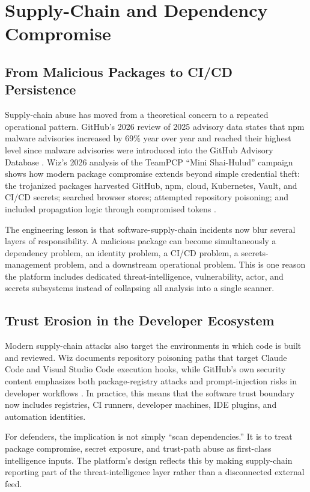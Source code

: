 \section{Supply-Chain and Dependency Compromise}
\subsection{From Malicious Packages to CI/CD Persistence}
Supply-chain abuse has moved from a theoretical concern to a repeated operational pattern. GitHub's 2026 review of 2025 advisory data states that npm malware advisories increased by 69\% year over year and reached their highest level since malware advisories were introduced into the GitHub Advisory Database \cite{github_oss_trends_2026}. Wiz's 2026 analysis of the TeamPCP ``Mini Shai-Hulud'' campaign shows how modern package compromise extends beyond simple credential theft: the trojanized packages harvested GitHub, npm, cloud, Kubernetes, Vault, and CI/CD secrets; searched browser stores; attempted repository poisoning; and included propagation logic through compromised tokens \cite{wiz_supply_chain_2026}.

The engineering lesson is that software-supply-chain incidents now blur several layers of responsibility. A malicious package can become simultaneously a dependency problem, an identity problem, a CI/CD problem, a secrets-management problem, and a downstream operational problem. This is one reason the platform includes dedicated threat-intelligence, vulnerability, actor, and secrets subsystems instead of collapsing all analysis into a single scanner.

\subsection{Trust Erosion in the Developer Ecosystem}
Modern supply-chain attacks also target the environments in which code is built and reviewed. Wiz documents repository poisoning paths that target Claude Code and Visual Studio Code execution hooks, while GitHub's own security content emphasizes both package-registry attacks and prompt-injection risks in developer workflows \cite{wiz_supply_chain_2026,github_supply_chain_2026}. In practice, this means that the software trust boundary now includes registries, CI runners, developer machines, IDE plugins, and automation identities.

For defenders, the implication is not simply ``scan dependencies.'' It is to treat package compromise, secret exposure, and trust-path abuse as first-class intelligence inputs. The platform's design reflects this by making supply-chain reporting part of the threat-intelligence layer rather than a disconnected external feed.

